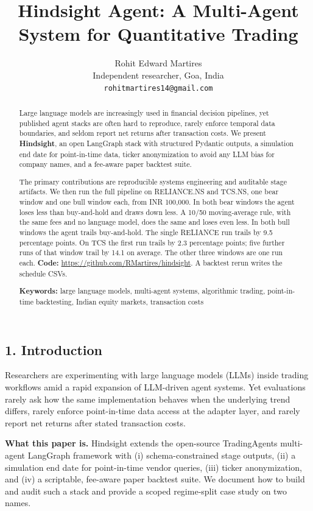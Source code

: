\documentclass{article}
\title{Hindsight Agent: A Multi-Agent System for Quantitative Trading}
\author{Rohit Edward Martires\\
  Independent researcher, Goa, India\\
  \texttt{rohitmartires14@gmail.com}}
\date{}
\begin{document}
\maketitle

\begin{abstract}
Large language models are increasingly used in financial decision
pipelines, yet published agent stacks are often hard to reproduce,
rarely enforce temporal data boundaries, and seldom report net returns
after transaction costs. We present \textbf{Hindsight}, an open
LangGraph stack with structured Pydantic outputs, a
simulation end date for point-in-time data, ticker anonymization to avoid any LLM bias for company names, and a fee-aware paper backtest suite.

The primary contributions are reproducible systems
engineering and auditable stage artifacts. We then run the full pipeline on RELIANCE.NS and TCS.NS,
one bear window and one bull window each, from INR 100,000.
In both bear windows the agent loses less than buy-and-hold and draws
down less. A 10/50 moving-average rule, with the same fees and no
language model, does the same and loses even less. In both bull windows
the agent trails buy-and-hold. The single RELIANCE run trails by 9.5
percentage points. On TCS the first run trails by 2.3 percentage points;
five further runs of that window trail by 14.1 on average. The other
three windows are one run each.
\textbf{Code:}
\url{https://github.com/RMartires/hindsight}.
A backtest rerun writes the schedule CSVs.

\medskip
\noindent\textbf{Keywords:} large language models, multi-agent systems, algorithmic trading, point-in-time backtesting, Indian equity markets, transaction costs
\end{abstract}

\subsection{1. Introduction}\label{introduction}

Researchers are experimenting with large language models (LLMs) inside
trading workflows amid a rapid expansion of LLM-driven agent systems. Yet evaluations rarely ask how the same implementation behaves when the underlying trend differs,
rarely enforce point-in-time data access at the adapter layer, and
rarely report net returns after stated transaction costs.

\textbf{What this paper is.} Hindsight extends the
open-source TradingAgents multi-agent LangGraph framework
\citep{xiao2024tradingagents} with (i) schema-constrained stage outputs, (ii) a
simulation end date for point-in-time vendor queries, (iii) ticker anonymization, and (iv) a scriptable, fee-aware paper backtest suite. We document how to build
and audit such a stack and provide a scoped regime-split case study on two names.
\end{document}
